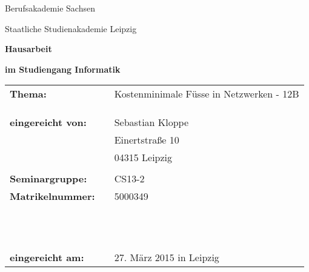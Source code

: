\thispagestyle{empty}
\begin{center}
\Large{Berufsakademie Sachsen}
\end{center}
 
\begin{center}
\Large{Staatliche Studienakademie Leipzig}
\end{center}
\hspace{4cm}

\begin{center}
\textbf{\LARGE{Hausarbeit}}\\
\end{center}

\begin{center}
\textbf{im Studiengang Informatik}\\
\end{center}
\hspace{4cm}

\begin{flushleft}
\begin{tabular}{l p{10pt} p{290pt}}
\\
\textbf{Thema:} & & Kostenminimale F\"usse in Netzwerken - 12B\\
& & \\
& & \\
& & \\
\textbf{eingereicht von:} & & Sebastian Kloppe \\
& &                           Einertstraße 10\\
& &                           04315 Leipzig\\
& & \\
\textbf{Seminargruppe:} & & CS13-2 \\
\textbf{Matrikelnummer:} & & 5000349\\
& & \\
& & \\
& & \\
& & \\
& & \\
& & \\
& & \\
& & \\
& & \\
& & \\
& & \\
& & \\
\textbf{eingereicht am:} & & 27. M\"arz 2015 in Leipzig\\
\end{tabular}
\end{flushleft}